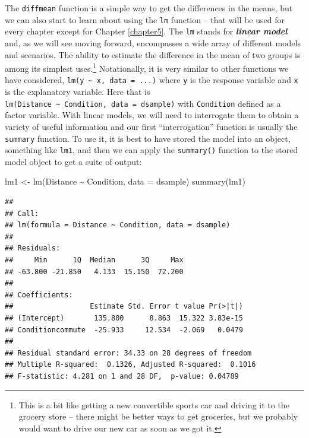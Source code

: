 \documentclass[
]{book}
\newenvironment{Shaded}{\begin{snugshade}}{\end{snugshade}}
\newcommand{\AttributeTok}[1]{\textcolor[rgb]{0.77,0.63,0.00}{#1}}
\newcommand{\FunctionTok}[1]{\textcolor[rgb]{0.00,0.00,0.00}{#1}}
\newcommand{\NormalTok}[1]{#1}
\newcommand{\OtherTok}[1]{\textcolor[rgb]{0.56,0.35,0.01}{#1}}
\newcommand{\SpecialCharTok}[1]{\textcolor[rgb]{0.00,0.00,0.00}{#1}}
\begin{document}
\indent The \texttt{diffmean} function is a simple way to get the differences in the means, but we can also start to learn about using the \texttt{lm}  function -- that will be used for every chapter except for Chapter \ref{chapter5}. The \texttt{lm} stands for \textbf{\emph{linear model}}  and, as we will see moving forward, encompasses a wide array of different models and scenarios. The ability to estimate the difference in the mean of two groups is among its simplest uses.\footnote{This is a bit like getting a new convertible sports car and driving it to the grocery store -- there might be better ways to get groceries, but we probably would want to drive our new car as soon as we got it.} Notationally, it is very similar to other functions we have considered, \texttt{lm(y\ \textasciitilde{}\ x,\ data\ =\ ...)} where \texttt{y} is the response variable and \texttt{x} is the explanatory variable. Here that is \texttt{lm(Distance\ \textasciitilde{}\ Condition,\ data\ =\ dsample)} with \texttt{Condition} defined as a factor variable. With linear models, we will need to interrogate them to obtain a variety of useful information and our first ``interrogation'' function is usually the \texttt{summary} function. To use it, it is best to have stored the model into an object, something like \texttt{lm1}, and then we can apply the \texttt{summary()}  function to the stored model object to get a suite of output:

\begin{Shaded}
\begin{Highlighting}[]
\NormalTok{lm1 }\OtherTok{\textless{}{-}} \FunctionTok{lm}\NormalTok{(Distance }\SpecialCharTok{\textasciitilde{}}\NormalTok{ Condition, }\AttributeTok{data =}\NormalTok{ dsample)}
\FunctionTok{summary}\NormalTok{(lm1)}
\end{Highlighting}
\end{Shaded}

\begin{verbatim}
## 
## Call:
## lm(formula = Distance ~ Condition, data = dsample)
## 
## Residuals:
##     Min      1Q  Median      3Q     Max 
## -63.800 -21.850   4.133  15.150  72.200 
## 
## Coefficients:
##                  Estimate Std. Error t value Pr(>|t|)
## (Intercept)       135.800      8.863  15.322 3.83e-15
## Conditioncommute  -25.933     12.534  -2.069   0.0479
## 
## Residual standard error: 34.33 on 28 degrees of freedom
## Multiple R-squared:  0.1326, Adjusted R-squared:  0.1016 
## F-statistic: 4.281 on 1 and 28 DF,  p-value: 0.04789
\end{verbatim}
\end{document}
